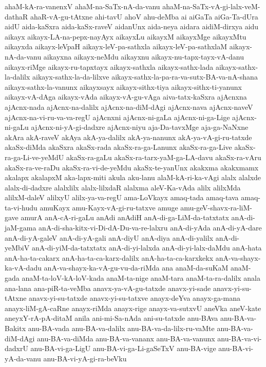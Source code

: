 {ahaM-kA-ra-vanenxV
ahaM-na-SaTx-nA-da-vanu
ahaM-na-SaTx-vA-gi-lalx-veM-dathaR
ahaR-vA-gu-tAtxne
ahi-tavU
ahoV
ahu-deMba
ai
aiGaTa
aiGa-Ta-dUra
aidU
aida-kaSxra
aida-kaSx-raveV
aidanUnx
aida-neya
aidara
aidiM-dirxya
aidu
aikayx
aikayx-LA-na-pepx-nayAyx
aikayxLu
aikayxM
aikayxMge
aikayxMtu
aikayxda
aikayx-leVpaH
aikayx-leV-pa-sathxla
aikayx-leV-pa-sathxlaM
aikayx-nA-da-vanu
aikayxna
aikayx-neMdu
aikayxnu
aikayx-nu-tapx-tayx-vA-danu
aikayx-riMge
aikayx-ru-tapxtayx
aikayx-sathxla
aikayx-sathx-lada
aikayx-sathx-la-dalilx
aikayx-sathx-la-da-lilxve
aikayx-sathx-la-pa-ra-va-sutx-BA-va-nA-shana
aikayx-sathx-la-vanunx
aikayxsayx
aikayx-sithx-tiya
aikayx-sithx-ti-yanunx
aikayx-vA-dAga
aikayx-vAda
aikayx-vA-gu-vAga
aiva-tatx-kaSxra
ajAcnxna
ajAcnx-nada
ajAcnx-na-dalilx
ajAcnx-na-diM-dAgi
ajAcnx-nava
ajAcnx-naveV
ajAcnx-na-vi-ru-va-va-regU
ajAcnxni
ajAcnx-ni-gaLa
ajAcnx-ni-ga-Lige
ajAcnx-ni-gaLu
ajAcnx-ni-yA-gi-dadxre
ajAcnx-niyu
aja-Da-tavxMge
aja-ga-NaNxne
akAra
akA-raveV
akAya
akA-ya-dalilx
akA-ya-nanunx
akA-ya-vA-gi-ru-tatxde
akaSx-diMda
akaSxra
akaSx-rada
akaSx-ra-ga-Lanunx
akaSx-ra-ga-Live
akaSx-ra-ga-Li-ve-yeMdU
akaSx-ra-gaLu
akaSx-ra-tarx-yaM-ga-LA-davu
akaSx-ra-vAru
akaSx-ra-ve-raDu
akaSx-ra-vi-de-yeMdu
akaSx-te-yanUnx
akakxma
akakxmamx
akalapx
akalapxM
aka-lapx-miti
akula
aku-lanu
alaM-kA-ri-ka-vAgi
alalx
alalxde
alalx-di-dadxre
alalxlilx
alalx-lilxdaR
alalxma
aleV-Ka-vAda
alilx
alilxMda
alilxM-daleV
alilxyU
alilx-ya-va-regU
ama-LoVkayx
amaq-tada
amaq-tava
amaq-ta-vi-hudu
amuKayx
amu-Kayx-vA-gi-ru-tatxve
amuge
amu-geV-shavx-ra-liM-gave
amurA
anA-cA-ri-gaLu
anAdi
anAdiH
anA-di-ga-LiM-da-tatxtatx
anA-di-jaM-gama
anA-di-sha-kitx-vi-Di-dA-Du-va-re-lalxru
anA-di-yAda
anA-di-yA-dare
anA-di-yA-galeV
anA-di-yA-gali
anA-diyU
anA-diya
anA-di-yalilx
anA-di-yeMbiV
anA-di-yiM-da-tatxtatx
anA-di-yi-lalxda
anA-di-yi-lalx-daMdu
anA-hata
anA-ha-ta-cakarx
anA-ha-ta-ca-karx-dalilx
anA-ha-ta-ca-karxkekx
anA-va-shayx-ka-vA-dadu
anA-va-shayx-ka-vA-gu-vu-da-riMda
ana
anaM-da-suKaM
anaM-gada
anaM-ta-loV-kA-loV-kada
anaM-ta-nige
anaM-tara
anaM-ta-ra-dalilx
anala
ana-lana
ana-piR-ta-veMba
anavx-ya-vA-gu-tatxde
anavx-yi-sade
anavx-yi-su-tAtxne
anavx-yi-su-tatxde
anavx-yi-su-tatxve
anayx-deYva
anayx-ga-mana
anayx-liM-gA-caRne
anayx-riMda
anayx-rige
anayx-va-sutxvU
aneVka
aneV-kate
aneyxY-rA-pA-ditaM
anila
ani-mi-Sa-nAda
ani-su-tatxde
anu-BAva
anu-BA-va-Bakitx
anu-BA-vada
anu-BA-va-dalilx
anu-BA-va-da-lilx-ru-vaMte
anu-BA-va-diM-dAgi
anu-BA-va-diMda
anu-BA-va-vananx
anu-BA-va-vanunx
anu-BA-va-vi-dadxrU
anu-BA-vi-ga-LigU
anu-BA-vi-ga-Li-gaSeTxV
anu-BA-vige
anu-BA-vi-yA-da-vanu
anu-BA-vi-yA-gi-ra-beVku
}
